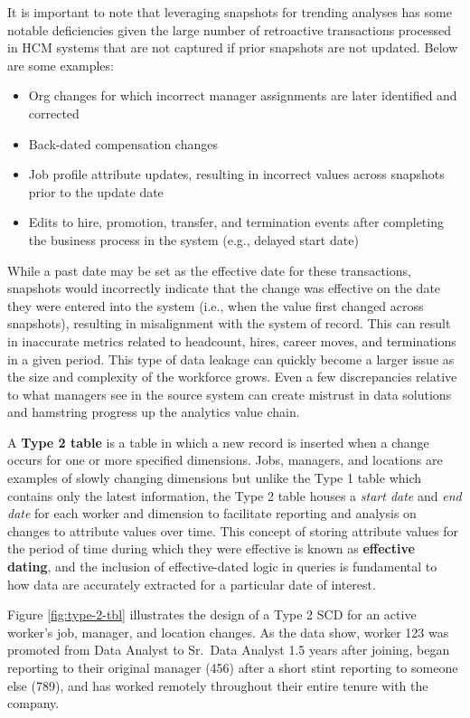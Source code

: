 \documentclass[
]{book}
\providecommand{\tightlist}{%
  \setlength{\itemsep}{0pt}\setlength{\parskip}{0pt}}
\begin{document}
It is important to note that leveraging snapshots for trending analyses has some notable deficiencies given the large number of retroactive transactions processed in HCM systems that are not captured if prior snapshots are not updated. Below are some examples:

\begin{itemize}
\tightlist
\item
  Org changes for which incorrect manager assignments are later identified and corrected
\item
  Back-dated compensation changes
\item
  Job profile attribute updates, resulting in incorrect values across snapshots prior to the update date
\item
  Edits to hire, promotion, transfer, and termination events after completing the business process in the system (e.g., delayed start date)
\end{itemize}

While a past date may be set as the effective date for these transactions, snapshots would incorrectly indicate that the change was effective on the date they were entered into the system (i.e., when the value first changed across snapshots), resulting in misalignment with the system of record. This can result in inaccurate metrics related to headcount, hires, career moves, and terminations in a given period. This type of data leakage can quickly become a larger issue as the size and complexity of the workforce grows. Even a few discrepancies relative to what managers see in the source system can create mistrust in data solutions and hamstring progress up the analytics value chain.

A \textbf{Type 2 table} is a table in which a new record is inserted when a change occurs for one or more specified dimensions. Jobs, managers, and locations are examples of slowly changing dimensions but unlike the Type 1 table which contains only the latest information, the Type 2 table houses a \emph{start date} and \emph{end date} for each worker and dimension to facilitate reporting and analysis on changes to attribute values over time. This concept of storing attribute values for the period of time during which they were effective is known as \textbf{effective dating}, and the inclusion of effective-dated logic in queries is fundamental to how data are accurately extracted for a particular date of interest.

Figure \ref{fig:type-2-tbl} illustrates the design of a Type 2 SCD for an active worker's job, manager, and location changes. As the data show, worker 123 was promoted from Data Analyst to Sr.~Data Analyst 1.5 years after joining, began reporting to their original manager (456) after a short stint reporting to someone else (789), and has worked remotely throughout their entire tenure with the company.
\end{document}
